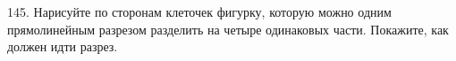 145. Нарисуйте по сторонам клеточек фигурку, которую можно одним прямолинейным разрезом разделить на четыре одинаковых части. Покажите, как должен идти разрез.\\
